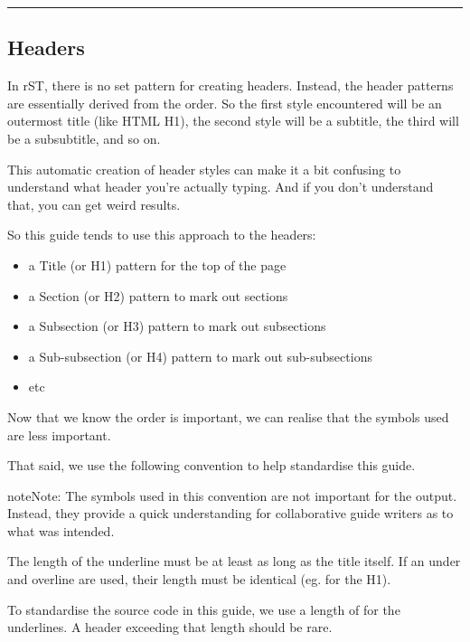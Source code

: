 \documentclass[letterpaper,10pt,english]{sphinxmanual}
\begin{document}
\bigskip\hrule\bigskip



\subsection{Headers}
\label{\detokenize{guide/99_rst-guide:headers}}
In rST, there is no set pattern for creating headers.
Instead, the header patterns are essentially derived from the order.
So the first style encountered will be an outermost title (like HTML H1), the second style will be a subtitle, the third will be a subsubtitle, and so on.

This automatic creation of header styles can make it a bit confusing to understand what header you’re actually typing. And if you don’t understand that, you can get weird results.

So this guide tends to use this approach to the headers:
\begin{itemize}
\item {} 
a Title (or H1) pattern for the top of the page

\item {} 
a Section (or H2) pattern to mark out sections

\item {} 
a Subsection (or H3) pattern to mark out subsections

\item {} 
a Sub-subsection (or H4) pattern to mark out sub-subsections

\item {} 
etc

\end{itemize}

Now that we know the order is important, we can realise that the symbols used are less important.

That said, we use the following convention to help standardise this guide.

\begin{sphinxadmonition}{note}{Note:}
The symbols used in this convention are not important for the output.
Instead, they provide a quick understanding for collaborative guide writers as to what was intended.

The length of the underline must be at least as long as the title itself.
If an under and overline are used, their length must be identical (eg. for the H1).

To standardise the source code in this guide, we use a length of  for the underlines.
A header exceeding that length should be rare.
\end{sphinxadmonition}
\end{document}
